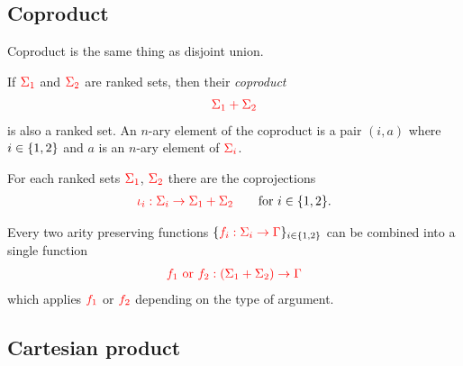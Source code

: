 \subsection{Coproduct}
Coproduct is the same thing as disjoint union. 

\datatypefigure
{
If ${\color{red}{\Sigma_1}}$ and ${\color{red}{\Sigma_2}}$ are ranked sets, then  their \emph{coproduct}
\begin{align*}
    {\color{red}{\Sigma_1 + \Sigma_2}}
\end{align*}
is also a ranked set. An $n$-ary element of the coproduct is a pair $(i,a)$ where $i \in \{1,2\}$ and $a$ is an $n$-ary element of  ${\color{red}{\Sigma_i}}$. 
}
{
   \item For each  ranked sets ${\color{red}{\Sigma_1}}$, ${\color{red}{\Sigma_2}}$ there are the coprojections
       \begin{align*}
           {\color{red}{\iota_i : \Sigma_i \to \Sigma_1 + \Sigma_2}} \qquad \text{for $i \in \{1,2\}$}.
       \end{align*}
       \item Every two arity preserving functions $\{{\color{red}{f_i : \Sigma_i \to \Gamma}}\}_{i \in \{1,2\}}$ can be combined into a single function 
       \begin{align*}
           {\color{red}{{\color{red}{f_1 \ \mathrm{or}\ f_2}} : (\Sigma_1 + \Sigma_2) \to \Gamma}}
       \end{align*}
       which applies ${\color{red}{f_1}}$ or ${\color{red}{f_2}}$ depending on the type of argument.
}
  
\subsection{Cartesian product}

